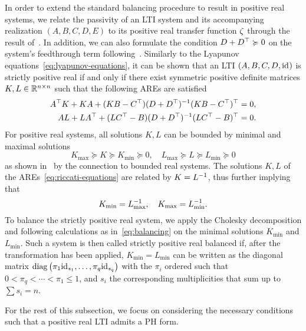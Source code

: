 In order to extend the standard balancing procedure to result in positive real systems, we relate the passivity of an \ac{LTI} system and its accompanying realization $(A, B, C, D, E)$ to its positive real transfer function $\tfunc$ through the result of~\cite[Corollary~2.7]{CGH2022}.
In addition, we can also formulate the condition $D + D\trans \succcurlyeq 0$ on the system's feedthrough term following~\cite[Definition~5]{Gugercin2007}.
Similarly to the Lyapunov equations~\eqref{eq:lyapunov-equations}, it can be shown that an \ac{LTI} $(A, B, C, D, \id)$ is strictly positive real if and only if there exist symmetric positive definite matrices $K, L \in \bb{R}^{n \times n}$ such that the following \acp{ARE} are satisfied
\begin{equation}\label{eq:riccati-equations}
    \begin{aligned}
        A\trans K + K A + (K B - C\trans) (D + D\trans)\inv (K B - C\trans)\trans &= 0, \\
        A L + L A\trans + (L C\trans - B) (D + D\trans)\inv (L C\trans - B)\trans &= 0.
    \end{aligned}
\end{equation}
For positive real systems, all solutions $K, L$ can be bounded by minimal and maximal solutions
\begin{equation*}
    K_{\max} \succcurlyeq K \succcurlyeq K_{\min} \succcurlyeq 0,\quad L_{\max} \succcurlyeq L \succcurlyeq L_{\min} \succcurlyeq 0
\end{equation*}
as shown in~\cite[Proposition~5.1]{Ober1991} by the connection to bounded real systems.
The solutions $K, L$ of the \acp{ARE}~\eqref{eq:riccati-equations} are related by $K = L\inv$, thus further implying that
\begin{equation*}
    K_{\min} = L_{\max}\inv,\quad K_{\max} = L_{\min}\inv.
\end{equation*}
To balance the strictly positive real system, we apply the Cholesky decomposition and following calculations as in~\eqref{eq:balancing} on the minimal solutions $K_{\min}$ and $L_{\min}$.
Such a system is then called strictly positive real balanced if, after the transformation has been applied, $K_{\min} = L_{\min}$ can be written as the diagonal matrix $\diag{\pi_1 \id[s_1], \dots, \pi_q \id[s_q]}$ with the $\pi_i$ ordered such that $0 < \pi_q < \cdots < \pi_1 \leq 1$, and $s_i$ the corresponding multiplicities that sum up to $\sum s_i = n$.

For the rest of this subsection, we focus on considering the necessary conditions such that a positive real \ac{LTI} admits a \ac{PH} form.

